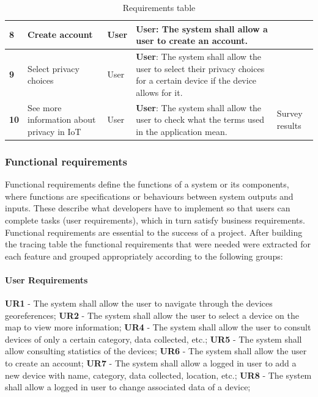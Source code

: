 \begin{table}[H]
\begin{adjustbox}{width=1\textwidth,center=\textwidth}
\begin{tabular}{|l|p{}|p{}|p{}|p{}|}
        \hline
        \textbf{8} & Create account & User & \textbf{User}: The system shall allow a user to create an account. &  \\
        \hline
        \textbf{9} & Select privacy choices & User & \textbf{User}: The system shall allow the user to select their privacy choices for a certain device if the device allows for it. &  \\
        \hline
        \textbf{10} & See more information about privacy in IoT & User & \textbf{User}: The system shall allow the user to check what the terms used in the application mean. & Survey results \\
        \hline
    \end{tabular}
    \end{adjustbox}
    \vspace{1em}
    \caption{Requirements table}
    \label{table:table1}
\end{table}

\subsubsection*{Functional requirements}

Functional requirements define the functions of a system or its components,
where functions are specifications or behaviours between system outputs and
inputs. These describe what developers have to implement
so that users can complete tasks (user requirements), which in turn satisfy
business requirements. Functional requirements are
essential to the success of a project.
After building the tracing table the functional requirements that were needed
were extracted for each feature and grouped appropriately according to the
following groups:

\paragraph*{User Requirements}

\textbf{UR1} - The system shall allow the user to navigate through the devices georeferences;
\newline
\textbf{UR2} - The system shall allow the user to select a device on the map to view more information;
\newline
\textbf{UR4} - The system shall allow the user to consult devices of only a certain category, data collected, etc.;
\newline
\textbf{UR5} - The system shall allow consulting statistics of the devices;
\newline
\textbf{UR6} - The system shall allow the user to create an account;
\newline
\textbf{UR7} - The system shall allow a logged in user to add a new device with name, category, data collected, location, etc.;
\newline
\textbf{UR8} - The system shall allow a logged in user to change associated data of a device;

